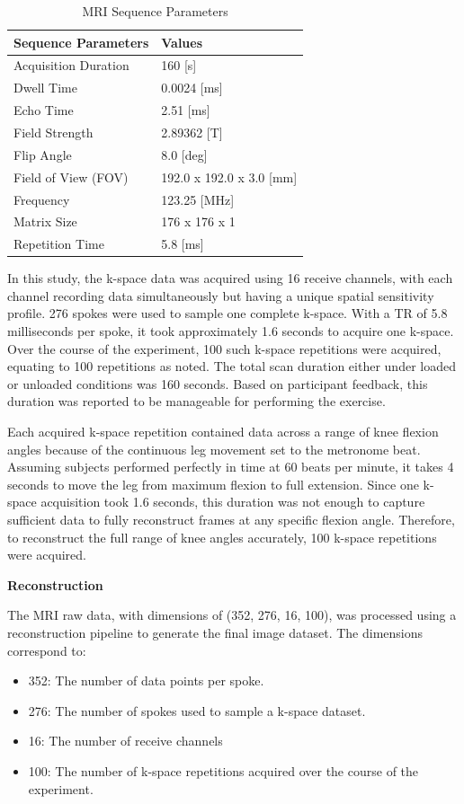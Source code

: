 \documentclass{micro-econ-thesis}
\begin{document}
\begin{table}[H]
	\centering
	
	\caption{MRI Sequence Parameters}
	\label{tab:mri_seq_params}
	\begin{tabular}{@{}ll@{}}
		\toprule
		Sequence Parameters & Values \\ \midrule
		Acquisition Duration & 160 [s] \\
		Dwell Time & 0.0024 [ms] \\
		Echo Time & 2.51 [ms] \\
		Field Strength & 2.89362 [T] \\
		Flip Angle & 8.0 [deg] \\
		Field of View (FOV) & 192.0 x 192.0 x 3.0 [mm] \\
		Frequency & 123.25 [MHz] \\
		Matrix Size & 176 x 176 x 1 \\
		Repetition Time & 5.8 [ms] \\
		\bottomrule
	\end{tabular}
\end{table}

In this study, the k-space data was acquired using 16 receive channels, with each channel recording data simultaneously but having a unique spatial sensitivity profile. 276 spokes were used to sample one complete k-space. With a TR of 5.8 milliseconds per spoke, it took approximately 1.6 seconds to acquire one k-space. Over the course of the experiment, 100 such k-space repetitions were acquired, equating to 100 repetitions as noted. The total scan duration either under loaded or unloaded conditions was 160 seconds. Based on participant feedback, this duration was reported to be manageable for performing the exercise. 

Each acquired k-space repetition contained data across a range of knee flexion angles because of the continuous leg movement set to the metronome beat. Assuming subjects performed perfectly in time at 60 beats per minute, it takes 4 seconds to move the leg from maximum flexion to full extension. Since one k-space acquisition took 1.6 seconds, this duration was not enough to capture sufficient data to fully reconstruct frames at any specific flexion angle. Therefore, to reconstruct the full range of knee angles accurately,  100 k-space repetitions were acquired. 
    
\textbf{Reconstruction}

The MRI raw data, with dimensions of (352, 276, 16, 100), was processed using a reconstruction pipeline to generate the final image dataset. The dimensions correspond to: 
\begin{itemize}
	\item 352: The number of data points per spoke.
	\item 276: The number of spokes used to sample a k-space dataset.
	\item 16: The number of receive channels
	\item 100: The number of k-space repetitions acquired over the course of the experiment.
\end{itemize}
\end{document}
